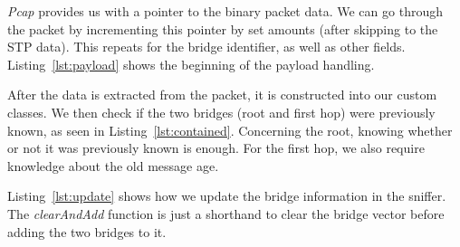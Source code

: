\textit{Pcap} provides us with a pointer to the binary packet data.
We can go through the packet by incrementing this pointer by set amounts (after skipping to the STP data).
This repeats for the bridge identifier, as well as other fields.
Listing~\ref{lst:payload} shows the beginning of the payload handling.


After the data is extracted from the packet, it is constructed into our custom classes.
We then check if the two bridges (root and first hop) were previously known, as seen in Listing~\ref{lst:contained}.
Concerning the root, knowing whether or not it was previously known is enough.
For the first hop, we also require knowledge about the old message age.


Listing~\ref{lst:update} shows how we update the bridge information in the sniffer.
The \textit{clearAndAdd} function is just a shorthand to clear the bridge vector before adding the two bridges to it.

